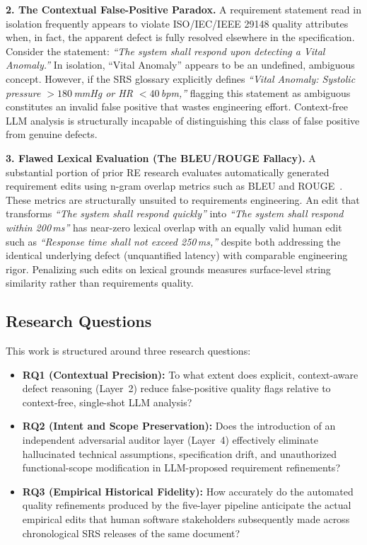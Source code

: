 \documentclass[journal]{IEEEtran}
\begin{document}
\textbf{2. The Contextual False-Positive Paradox.} A requirement statement read in isolation frequently appears to violate ISO/IEC/IEEE 29148 quality attributes when, in fact, the apparent defect is fully resolved elsewhere in the specification. Consider the statement: \textit{``The system shall respond upon detecting a Vital Anomaly.''} In isolation, ``Vital Anomaly'' appears to be an undefined, ambiguous concept. However, if the SRS glossary explicitly defines \textit{``Vital Anomaly: Systolic pressure $> 180$\,mmHg or HR $< 40$\,bpm,''} flagging this statement as ambiguous constitutes an invalid false positive that wastes engineering effort. Context-free LLM analysis is structurally incapable of distinguishing this class of false positive from genuine defects.

\textbf{3. Flawed Lexical Evaluation (The BLEU/ROUGE Fallacy).} A substantial portion of prior RE research evaluates automatically generated requirement edits using n-gram overlap metrics such as BLEU and ROUGE~\cite{reiter2018structured,sulem2018bleu}. These metrics are structurally unsuited to requirements engineering. An edit that transforms \textit{``The system shall respond quickly''} into \textit{``The system shall respond within 200\,ms''} has near-zero lexical overlap with an equally valid human edit such as \textit{``Response time shall not exceed 250\,ms,''} despite both addressing the identical underlying defect (unquantified latency) with comparable engineering rigor. Penalizing such edits on lexical grounds measures surface-level string similarity rather than requirements quality.

\subsection{Research Questions}
\label{sec:rqs}

This work is structured around three research questions:
\begin{itemize}
    \item \textbf{RQ1 (Contextual Precision):} To what extent does explicit, context-aware defect reasoning (Layer~2) reduce false-positive quality flags relative to context-free, single-shot LLM analysis?
    \item \textbf{RQ2 (Intent and Scope Preservation):} Does the introduction of an independent adversarial auditor layer (Layer~4) effectively eliminate hallucinated technical assumptions, specification drift, and unauthorized functional-scope modification in LLM-proposed requirement refinements?
    \item \textbf{RQ3 (Empirical Historical Fidelity):} How accurately do the automated quality refinements produced by the five-layer pipeline anticipate the actual empirical edits that human software stakeholders subsequently made across chronological SRS releases of the same document?
\end{itemize}
\end{document}
